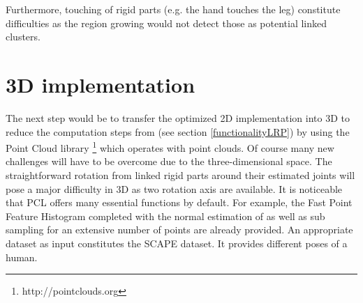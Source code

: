 Furthermore, touching of rigid parts (e.g. the hand touches the leg) constitute difficulties as the region growing would not detect those as potential linked clusters.


\section{3D implementation}

The next step would be to transfer the optimized 2D implementation into 3D to reduce the computation steps from \cite{guo2016correspondence} (see section \ref{functionalityLRP}) by using the Point Cloud library \footnote{http://pointclouds.org} which operates with point clouds. Of course many new challenges will have to be overcome due to the three-dimensional space. The straightforward rotation from linked rigid parts around their estimated joints will pose a major difficulty in 3D as two rotation axis are available. It is noticeable that PCL offers many essential functions by default. For example, the Fast Point Feature Histogram completed with the normal estimation of as well as sub sampling for an extensive number of points are already provided. An appropriate dataset as input constitutes the SCAPE dataset. It provides different poses of a human.







